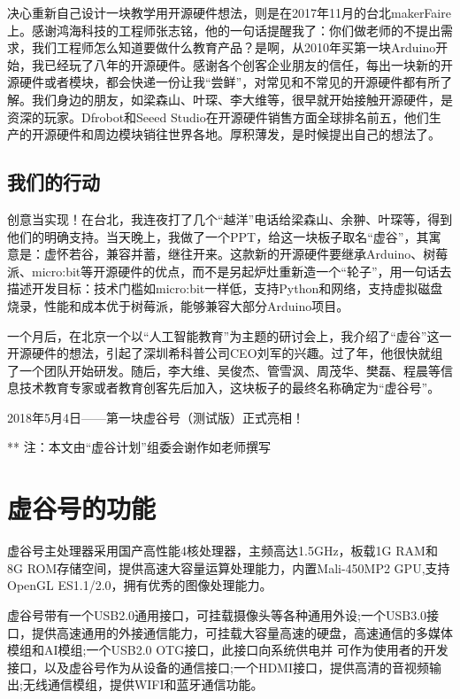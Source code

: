 \documentclass[letterpaper,10pt,english]{sphinxmanual}
\begin{document}
决心重新自己设计一块教学用开源硬件想法，则是在2017年11月的台北makerFaire上。感谢鸿海科技的工程师张志铭，他的一句话提醒我了：你们做老师的不提出需求，我们工程师怎么知道要做什么教育产品？是啊，从2010年买第一块Arduino开始，我已经玩了八年的开源硬件。感谢各个创客企业朋友的信任，每出一块新的开源硬件或者模块，都会快递一份让我“尝鲜”，对常见和不常见的开源硬件都有所了解。我们身边的朋友，如梁森山、叶琛、李大维等，很早就开始接触开源硬件，是资深的玩家。Dfrobot和Seeed Studio在开源硬件销售方面全球排名前五，他们生产的开源硬件和周边模块销往世界各地。厚积薄发，是时候提出自己的想法了。


\subsection{我们的行动}
\label{\detokenize{01.about/1.1-story:id4}}
创意当实现！在台北，我连夜打了几个“越洋”电话给梁森山、余翀、叶琛等，得到他们的明确支持。当天晚上，我做了一个PPT，给这一块板子取名“虚谷”，其寓意是：虚怀若谷，兼容并蓄，继往开来。这款新的开源硬件要继承Arduino、树莓派、micro:bit等开源硬件的优点，而不是另起炉灶重新造一个“轮子”，用一句话去描述开发目标：技术门槛如micro:bit一样低，支持Python和网络，支持虚拟磁盘烧录，性能和成本优于树莓派，能够兼容大部分Arduino项目。

一个月后，在北京一个以“人工智能教育”为主题的研讨会上，我介绍了“虚谷”这一开源硬件的想法，引起了深圳希科普公司CEO刘军的兴趣。过了年，他很快就组了一个团队开始研发。随后，李大维、吴俊杰、管雪沨、周茂华、樊磊、程晨等信息技术教育专家或者教育创客先后加入，这块板子的最终名称确定为“虚谷号”。

2018年5月4日——第一块虚谷号（测试版）正式亮相！

\noindent{}

** 注：本文由“虚谷计划”组委会谢作如老师撰写


\section{虚谷号的功能}
\label{\detokenize{01.about/1.2-function:id1}}\label{\detokenize{01.about/1.2-function::doc}}
虚谷号主处理器采用国产高性能4核处理器，主频高达1.5GHz，板载1G RAM和8G ROM存储空间，提供高速大容量运算处理能力，内置Mali-450MP2 GPU,支持OpenGL ES1.1/2.0，拥有优秀的图像处理能力。

虚谷号带有一个USB2.0通用接口，可挂载摄像头等各种通用外设;一个USB3.0接口，提供高速通用的外接通信能力，可挂载大容量高速的硬盘，高速通信的多媒体模组和AI模组;一个USB2.0 OTG接口，此接口向系统供电并 可作为使用者的开发接口，以及虚谷号作为从设备的通信接口;一个HDMI接口，提供高清的音视频输出;无线通信模组，提供WIFI和蓝牙通信功能。
\end{document}
